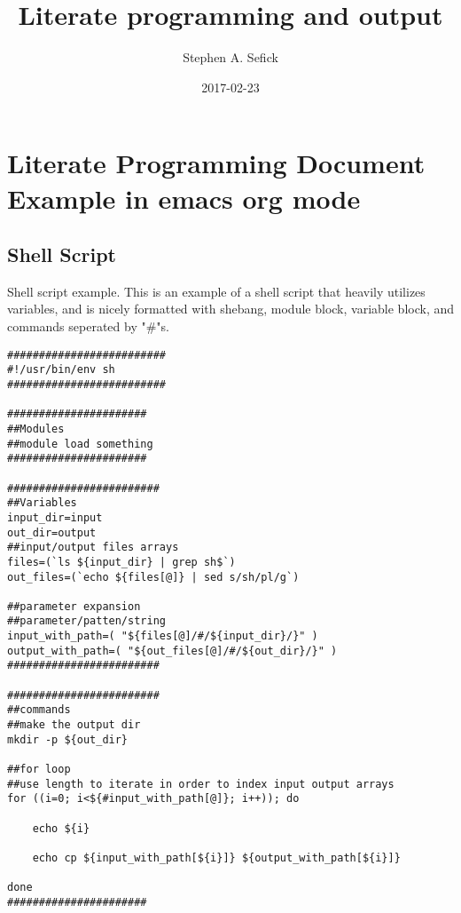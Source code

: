 \documentclass[t,10pt]{article}
\author{Stephen A. Sefick}
\date{2017-02-23}
\title{Literate programming and output}
\begin{document}
\maketitle

\section{Literate Programming Document Example in emacs org mode}
\label{sec:orgheadline2}

\subsection{Shell Script}
\label{sec:orgheadline1}

Shell script example. This is an example of a shell script that heavily utilizes variables, and is nicely formatted with shebang, module block, variable block, and commands seperated by "\#"s.

\lstset{language=sh,label= ,caption= ,captionpos=b,numbers=none}
\begin{lstlisting}
#########################
#!/usr/bin/env sh
#########################

######################
##Modules
##module load something
######################

########################
##Variables
input_dir=input
out_dir=output
##input/output files arrays
files=(`ls ${input_dir} | grep sh$`)
out_files=(`echo ${files[@]} | sed s/sh/pl/g`)

##parameter expansion
##parameter/patten/string
input_with_path=( "${files[@]/#/${input_dir}/}" )
output_with_path=( "${out_files[@]/#/${out_dir}/}" )
########################

########################
##commands
##make the output dir
mkdir -p ${out_dir}

##for loop
##use length to iterate in order to index input output arrays
for ((i=0; i<${#input_with_path[@]}; i++)); do

    echo ${i}

    echo cp ${input_with_path[${i}]} ${output_with_path[${i}]} 

done
######################
\end{lstlisting}
\end{document}
